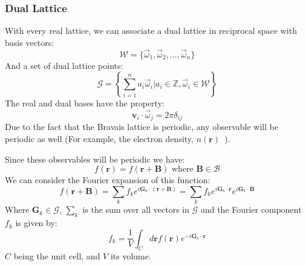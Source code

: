 \documentclass[12pt]{article}
\begin{document}
\subsubsection{Dual Lattice}
With every real lattice, we can associate a dual lattice in reciprocal space with basis vectors:
\begin{equation}\label{eq:dual_basis}
	\mathcal{W} = \{\vec{\omega}_1, \vec \omega _2, ..., \vec{\omega}_n\}
\end{equation}
And a set of dual lattice points:
\begin{equation}\label{eq:dual_lattice}
	\mathcal{G} = \left \{\sum_{i=1}^n a_i\vec{\omega}_i \Big | a_i \in \mathbb{Z}, \vec{\omega}_i \in \mathcal{W}  \right \}
\end{equation}
The real and dual bases have the property:
\begin{equation}
	\mathbf v _ i \cdot \vec\omega_j = 2\pi\delta_{ij}
\end{equation}
Due to the fact that the Bravais lattice is periodic, any observable will be periodic as well (For example, the electron density, $n(\mathbf{r})$\ ).

Since these observables will be periodic we have:
\begin{equation}\label{eq:periodic_observable}
	f(\mathbf r) = f(\mathbf r + \mathbf B) \text{ where } \mathbf B \in \mathcal B
\end{equation}
We can consider the Fourier expansion of this function:
\begin{equation}\label{eq:f_fourier_expansion}
	f(\mathbf r + \mathbf B) = \sum_k f_k e ^ {i \mathbf G_k\cdot(\mathbf r + \mathbf B)} 
	= \sum _k f_k e ^ {i \mathbf G_k \cdot \mathbf r} e ^ {i \mathbf G_k \cdot \mathbf B}
\end{equation}
Where $\mathbf G_k \in \mathcal G$, $\sum_k$ is the sum over all vectors in $\mathcal G$ and the Fourier component $f_k$ is given by:
\begin{equation}
	f_k = \frac{1}{V}\int_Cd\mathbf rf(\mathbf r)e^{-i\mathbf G_k\cdot \mathbf r}
\end{equation}
$C$ being the unit cell, and $V$ its volume.
\end{document}
